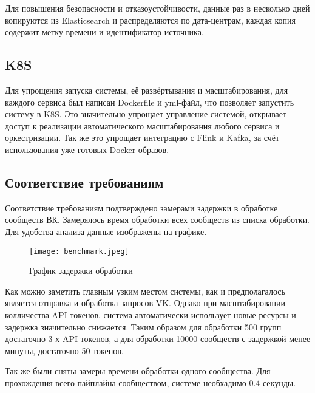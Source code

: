            Для повышения безопасности и отказоустойчивости, данные раз в несколько дней копируются из Elasticsearch и распределяются по дата-центрам, каждая копия содержит метку времени и идентификатор источника.

    \subsection{K8S}
        Для упрощения запуска системы, её развёртывания и масштабирования, для каждого сервиса был написан Dockerfile и yml-файл, что позволяет запустить систему в K8S. Это значительно упрощает управление системой, открывает доступ к реализации автоматического масштабирования любого сервиса и оркестризации. Так же это упрощает интеграцию с Flink и Kafka, за счёт использования уже готовых Docker-образов. 
    
    \subsection{Соответствие требованиям}
        Соответствие требованиям подтверждено замерами задержки в обработке сообществ ВК. Замерялось время обработки всех сообществ из списка обработки.  Для удобства анализа данные изображены на графике. 
        \begin{figure}
            \centering
            \texttt{[image: benchmark.jpeg]}
            \caption{График задержки обработки}
        \end{figure}

        Как можно заметить главным узким местом системы, как и предполагалось является отправка и обработка запросов VK. Однако при масштабировании колличества API-токенов, система автоматически использует новые ресурсы и задержка значительно снижается. Таким образом для обработки 500 групп достаточно 3-х API-токенов, а для обработки 10000 сообществ с задержкой менее минуты, достаточно 50 токенов.

        Так же были сняты замеры времени обработки одного сообщества. Для прохождения всего пайплайна сообществом, системе необхадимо $0.4$ секунды.
        
